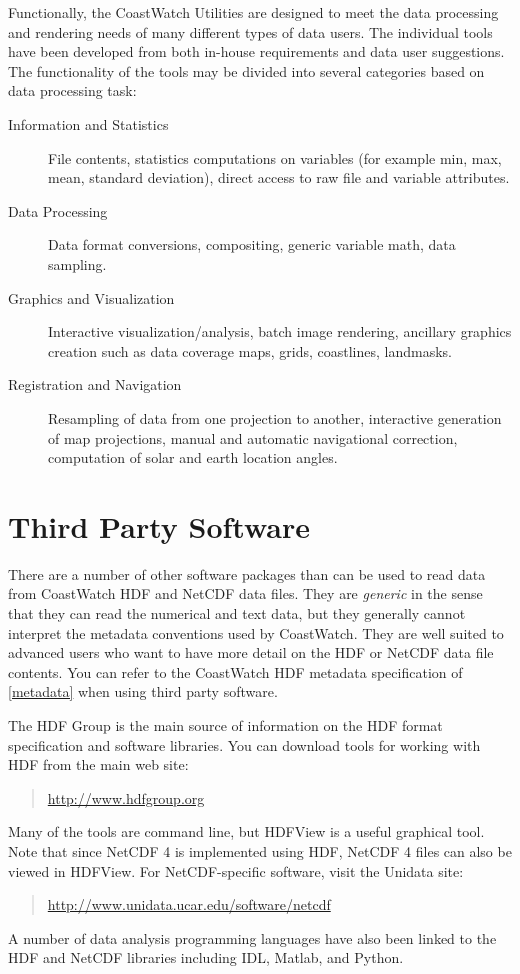 Functionally, the CoastWatch Utilities are designed to meet the data
processing and rendering needs of many different types of data users.
The individual tools have been developed from both in-house
requirements and data user suggestions.  The functionality of the
tools may be divided into several categories based on data processing
task:
\begin{description}

  \item[Information and Statistics] File contents, statistics
  computations on variables (for example min, max, mean, standard
  deviation), direct access to raw file and variable attributes.

  \item[Data Processing] Data format conversions,
  compositing, generic variable math, data sampling.

  \item[Graphics and Visualization] Interactive
  visualization/analysis, batch image rendering, ancillary graphics
  creation such as data coverage maps, grids, coastlines, landmasks.
    
  \item[Registration and Navigation] Resampling of data from one
  projection to another, interactive generation of map projections,
  manual and automatic navigational correction, computation of solar
  and earth location angles.

\end{description}

\section{Third Party Software}
\label{third}

There are a number of other software packages than can
be used to read data from CoastWatch HDF and NetCDF data files.  They are {\em
generic} in the sense that they can read the numerical and text data,
but they generally cannot interpret the metadata conventions used by CoastWatch.
They are well suited to advanced users who want to have more detail on
the HDF or NetCDF data file contents.  You can refer to the CoastWatch
HDF metadata specification of \autoref{metadata} when using third
party software.

The HDF Group is the main source of information
on the HDF format specification and software libraries.  You can
download tools for working with HDF from the main web site:
\begin{quote}
  \url{http://www.hdfgroup.org}
\end{quote} 
Many of the tools are command line, but HDFView is a useful graphical
tool.  Note that since NetCDF 4 is implemented using HDF, NetCDF 4 files can
also be viewed in HDFView.  For NetCDF-specific software, visit the Unidata site:
\begin{quote}
  \url{http://www.unidata.ucar.edu/software/netcdf}
\end{quote}

A number of data analysis programming languages have also been linked to the
HDF and NetCDF libraries including IDL, Matlab, and Python.

